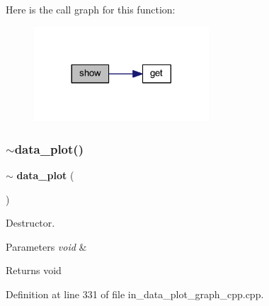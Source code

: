 Here is the call graph for this function\+:
\nopagebreak
\begin{figure}[H]
\begin{center}
\leavevmode
\includegraphics[width=185pt]{group__data__plot_ga6ebd3de1e1c0236f8e54525ebe52fead_cgraph}
\end{center}
\end{figure}
\mbox{\label{group__data__plot_gafd321bd40ed347458e213f5c9201ce46}} 
\subsubsection{$\sim$data\_plot()}
{\footnotesize\ttfamily $\sim$\textbf{ data\+\_\+plot} (\begin{DoxyParamCaption}\item[{void}]{ }\end{DoxyParamCaption})}



Destructor. 


\begin{DoxyParams}{Parameters}
{\em void} & \\
\hline
\end{DoxyParams}
\begin{DoxyReturn}{Returns}
void 
\end{DoxyReturn}


Definition at line 331 of file in\+\_\+data\+\_\+plot\+\_\+graph\+\_\+cpp.\+cpp.

